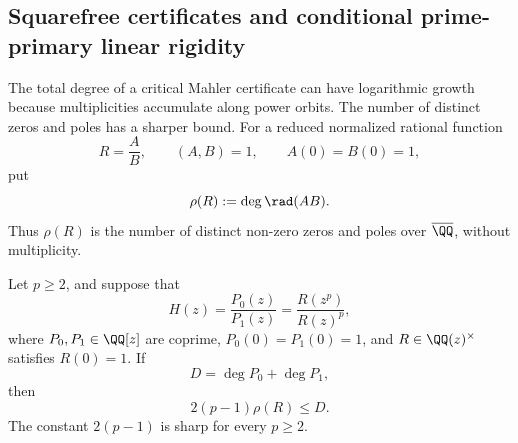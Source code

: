 \subsection{Squarefree certificates and conditional prime-primary linear rigidity}
\label{sec:linear-collision-rigidity}

The total degree of a critical Mahler certificate can have logarithmic
growth because multiplicities accumulate along power orbits.  The number of
distinct zeros and poles has a sharper bound.  For a reduced normalized
rational function
\[
 R=\frac AB,
 \qquad (A,B)=1,
 \qquad A(0)=B(0)=1,
\]
put
\[
 \rho(R):=\deg\rad(AB).
\]
Thus \(\rho(R)\) is the number of distinct non-zero zeros and poles over
\(\overline{\QQ}\), without multiplicity.

\begin{theorem}
\label{thm:squarefree-mahler-bound}
Let \(p\ge2\), and suppose that
\begin{equation}\label{eq:squarefree-mahler-coboundary}
 H(z)=\frac{P_0(z)}{P_1(z)}
 =\frac{R(z^p)}{R(z)^p},
\end{equation}
where \(P_0,P_1\in\QQ[z]\) are coprime,
\(P_0(0)=P_1(0)=1\), and \(R\in\QQ(z)^\times\) satisfies \(R(0)=1\).
If
\[
 D=\deg P_0+\deg P_1,
\]
then
\begin{equation}\label{eq:sharp-squarefree-mahler-bound}
 2(p-1)\rho(R)\le D.
\end{equation}
The constant \(2(p-1)\) is sharp for every \(p\ge2\).
\end{theorem}

